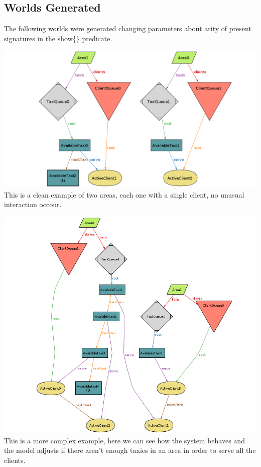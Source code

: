 \documentclass{article}
\begin{document}
\subsection{Worlds Generated}
The following worlds were generated changing parameters about arity of present signatures in the show\{\} predicate.\\
\begin{center}
	\includegraphics[width=.9\textwidth,height=.9\textheight,keepaspectratio]{Alloy/2Areas}
	\\This is a clean example of two areas, each one with a single client, no unusual interaction occour.\\
\end{center}
\begin{center}
	\includegraphics[width=.9\textwidth,height=.9\textheight,keepaspectratio]{Alloy/CrossAreaService}
	\\This is a more complex example, here we can see how the system behaves and the model adjusts if there aren't enough taxies in an area in order to serve all the clients.
\end{center}
\end{document}
